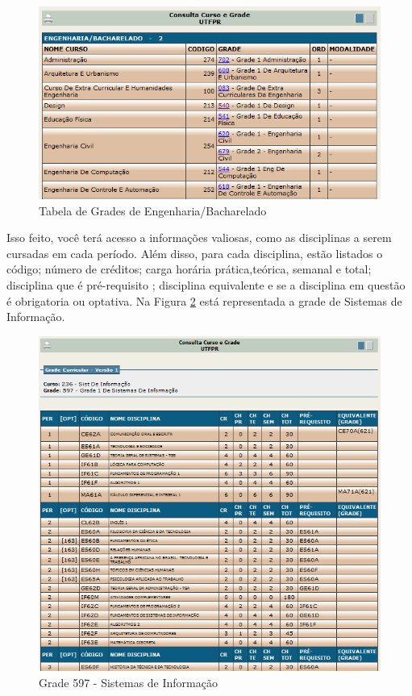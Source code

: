 \documentclass[a4paper,12pt,openany]{article}
\begin{document}
	\begin{figure}[ht!]  \centering
		\includegraphics[scale=0.8]{Grade_Tabela.png}
		\caption{Tabela de Grades de Engenharia/Bacharelado}
		\label{gradeTabela}
	\end{figure}

Isso feito, você terá acesso a informações valiosas, como as disciplinas a serem cursadas em cada período. Além disso, para cada disciplina, estão listados o código; número de créditos; carga horária prática,teórica, semanal e total; disciplina que é pré-requisito ; disciplina equivalente e se a disciplina em questão é obrigatoria ou optativa. Na Figura \ref{gradeCurso} está representada a grade de Sistemas de Informação.

	\begin{figure}[ht!]  \centering
		\includegraphics[scale=0.8]{Grade_Curso.png}
		\caption{Grade 597 - Sistemas de Informação}
		\label{gradeCurso}
	\end{figure}
\end{document}
